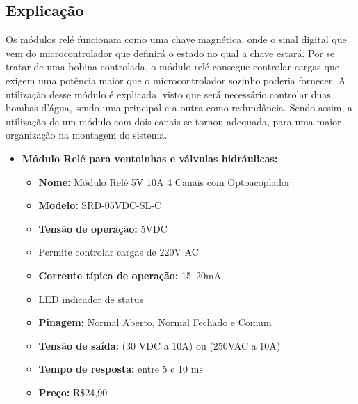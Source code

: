 \subsection{Explicação}
Os módulos relé funcionam como uma chave magnética, onde o sinal digital que vem do microcontrolador que definirá o estado no qual a chave estará. Por se tratar de uma bobina controlada, o módulo relé consegue controlar cargas que exigem uma potência maior que o microcontrolador sozinho poderia fornecer. A utilização desse módulo é explicada, visto que será necessário controlar duas bombas d'água, sendo uma principal e a outra como redundância. Sendo assim, a utilização de um módulo com dois canais se tornou adequada, para uma maior organização na montagem do sistema.\\
\begin{itemize}
	\item \textbf{Módulo Relé para ventoinhas e válvulas hidráulicas:}
	\begin{itemize}
		\item \textbf{Nome:} Módulo Relé 5V 10A 4 Canais com Optoacoplador
		\item \textbf{Modelo:} SRD-05VDC-SL-C 
		\item \textbf{Tensão de operação:} 5VDC
		\item Permite controlar cargas de 220V AC
		\item \textbf{Corrente típica de operação:} 15~20mA
		\item LED indicador de status
		\item \textbf{Pinagem:} Normal Aberto, Normal Fechado e Comum
		\item \textbf{Tensão de saída:} (30 VDC a 10A) ou (250VAC a 10A)
		\item \textbf{Tempo de resposta:} entre 5 e 10 ms
		\item \textbf{Preço:} R\$24,90
	\end{itemize}
	
	
\end{itemize}

